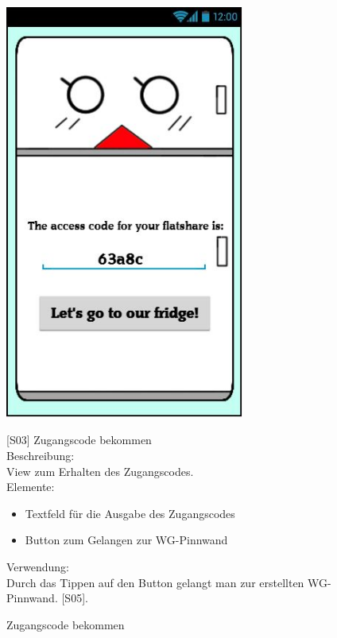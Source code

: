 \documentclass[a4paper]{scrreprt}
\begin{document}
    	\begin{figure}[h]
    		\begin{minipage}[b]{0.4\linewidth}
    			
    			\flushright
    			\centering
    			\includegraphics[width=0.7\textwidth]{fridget_accesscode.JPG}
    			\caption{Zugangscode bekommen}
    			\label{fig:figure1}
    		\end{minipage}
    		\hspace{0.5cm}
    		\begin{minipage}[b]{0.55\linewidth}
    			\flushleft
    			{[}S03{]} Zugangscode bekommen \\
    			
    			Beschreibung: \\
    			View zum Erhalten des Zugangscodes.
    			\\
    			Elemente:
    			\begin{itemize}
    				\renewcommand\labelitemi{--}
    				\item Textfeld für die Ausgabe des Zugangscodes
    				\item Button zum Gelangen zur WG-Pinnwand
    				
    			\end{itemize}
    			
    			Verwendung:\\
    			Durch das Tippen auf den Button gelangt man
    			zur erstellten WG-Pinnwand. {[}S05{]}.
    			
    			\vspace{20mm}
    			
    		\end{minipage}
    	\end{figure}
    	
\end{document}
